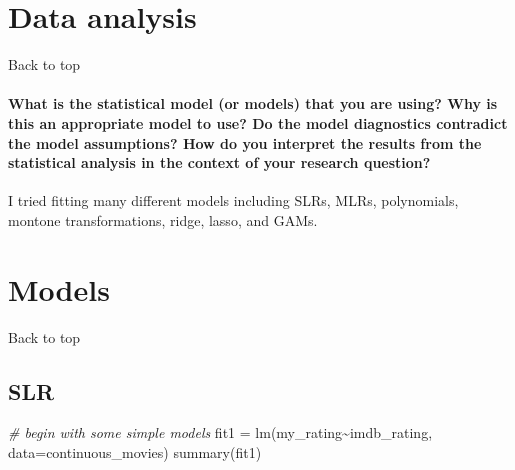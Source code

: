 \documentclass[
]{article}
\newenvironment{Shaded}{\begin{snugshade}}{\end{snugshade}}
\newcommand{\AttributeTok}[1]{\textcolor[rgb]{0.77,0.63,0.00}{#1}}
\newcommand{\CommentTok}[1]{\textcolor[rgb]{0.56,0.35,0.01}{\textit{#1}}}
\newcommand{\FunctionTok}[1]{\textcolor[rgb]{0.00,0.00,0.00}{#1}}
\newcommand{\NormalTok}[1]{#1}
\newcommand{\OtherTok}[1]{\textcolor[rgb]{0.56,0.35,0.01}{#1}}
\newcommand{\SpecialCharTok}[1]{\textcolor[rgb]{0.00,0.00,0.00}{#1}}
\begin{document}
\hypertarget{data-analysis}{%
\section{Data analysis}\label{data-analysis}}

Back to top

\hypertarget{what-is-the-statistical-model-or-models-that-you-are-using-why-is-this-an-appropriate-model-to-use-do-the-model-diagnostics-contradict-the-model-assumptions-how-do-you-interpret-the-results-from-the-statistical-analysis-in-the-context-of-your-research-question}{%
\paragraph{What is the statistical model (or models) that you are using?
Why is this an appropriate model to use? Do the model diagnostics
contradict the model assumptions? How do you interpret the results from
the statistical analysis in the context of your research
question?}\label{what-is-the-statistical-model-or-models-that-you-are-using-why-is-this-an-appropriate-model-to-use-do-the-model-diagnostics-contradict-the-model-assumptions-how-do-you-interpret-the-results-from-the-statistical-analysis-in-the-context-of-your-research-question}}

I tried fitting many different models including SLRs, MLRs, polynomials,
montone transformations, ridge, lasso, and GAMs.

\hypertarget{models}{%
\section{Models}\label{models}}

Back to top

\hypertarget{slr}{%
\subsection{SLR}\label{slr}}

\begin{Shaded}
\begin{Highlighting}[]
\CommentTok{\# begin with some simple models}
\NormalTok{fit1 }\OtherTok{=} \FunctionTok{lm}\NormalTok{(my\_rating}\SpecialCharTok{\textasciitilde{}}\NormalTok{imdb\_rating, }\AttributeTok{data=}\NormalTok{continuous\_movies)}
\FunctionTok{summary}\NormalTok{(fit1)}
\end{Highlighting}
\end{Shaded}
\end{document}
